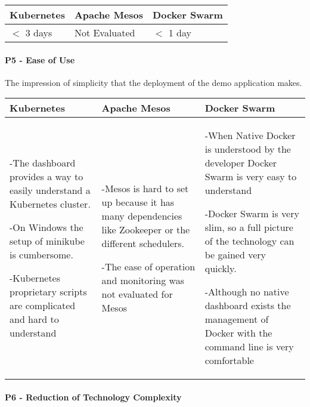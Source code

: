 \begin{center}
  \begin{tabular}{ | p{4.5cm} | p{4.5cm} | p{4.5cm} | }
    \hline
    \textbf{Kubernetes}&\textbf{Apache Mesos}&\textbf{Docker Swarm}\\\hline
    $<$ 3 days & Not Evaluated & $<$ 1 day \\
    \hline
  \end{tabular}
\end{center}

\newpage
\paragraph{P5 - Ease of Use}

The impression of simplicity that the deployment of the demo application
makes.

\begin{center}
  \begin{tabular}{ | p{4.5cm} | p{4.5cm} | p{4.5cm} | }
    \hline
    \textbf{Kubernetes}&\textbf{Apache Mesos}&\textbf{Docker Swarm}\\\hline
    -The dashboard provides a way to easily understand a Kubernetes
    cluster.
    
    -On Windows the setup of minikube is cumbersome.
    
    -Kubernetes proprietary scripts are complicated and hard to understand&
    
    
    -Mesos is hard to set up because it has many dependencies like Zookeeper
    or the different schedulers.
    
    -The ease of operation and monitoring was not evaluated for Mesos& 
    
    -When Native Docker is understood by the developer Docker Swarm is very
    easy to understand
    
    -Docker Swarm is very slim, so a full picture of the technology can be
    gained very quickly.
    
    -Although no native dashboard exists the management of Docker with the
    command line is very comfortable\\
    \hline
  \end{tabular}
\end{center}

\paragraph{P6 - Reduction of Technology Complexity}

